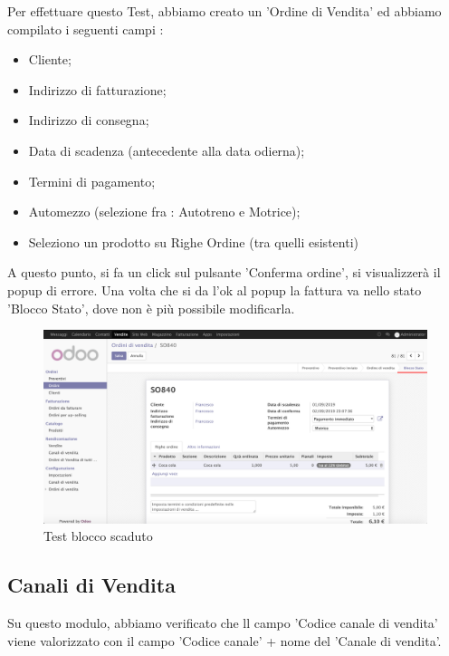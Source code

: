 \vspace*{0.5cm}
Per effettuare questo Test, abbiamo creato un 'Ordine di Vendita' ed abbiamo compilato i seguenti campi :

\begin{itemize}
	\item Cliente;
	\item Indirizzo di fatturazione;
	\item Indirizzo di consegna;
	\item Data di scadenza (antecedente alla data odierna);
	\item Termini di pagamento;
	\item Automezzo (selezione fra : Autotreno e Motrice);
	\item Seleziono un prodotto su Righe Ordine (tra quelli esistenti)
\end{itemize}

A questo punto, si fa un click sul pulsante 'Conferma ordine', si visualizzerà il popup di errore.
Una volta che si da l'ok al popup la fattura va nello stato 'Blocco Stato', dove non è più possibile modificarla.


\begin{figure}[H]
	\begin{center} \includegraphics[scale=0.3]{figures/third_test}
		\caption[Test blocco scaduto]{Test blocco scaduto}
		\label{fig:third_test}
	\end{center}
\end{figure}

\subsection{Canali di Vendita}

Su questo modulo, abbiamo verificato che ll campo 'Codice canale di vendita' viene valorizzato con il campo 'Codice canale' + nome del 'Canale di vendita'.

